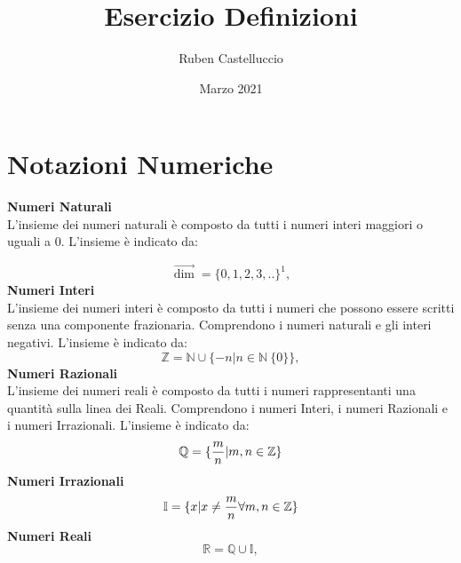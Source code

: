 \documentclass{article}
\title{Esercizio Definizioni}
\author{Ruben Castelluccio}
\date{Marzo 2021}
\begin{document}
\maketitle

\section{Notazioni Numeriche}
\textbf{Numeri Naturali}
\\
L’insieme dei numeri naturali è composto da tutti i numeri interi maggiori o uguali a 0. L’insieme è indicato da:

\begin{equation}
  \overrightarrow{\dim} = \{0,1,2,3,..\}^1,
\end{equation}
\textbf{Numeri Interi}
\\
L’insieme dei numeri interi è composto da tutti i numeri che possono essere scritti senza una componente frazionaria. Comprendono i numeri naturali e gli interi negativi. L’insieme è indicato da:
\begin{equation}
  \mathbb{Z} = \mathbb{N} \cup \{ -n | n \in \mathbb{N} \ \{0\}\},
\end{equation}
\textbf{Numeri Razionali}
\\
L’insieme dei numeri reali è composto da tutti i numeri rappresentanti una quantità sulla linea dei Reali. Comprendono i numeri Interi, i numeri Razionali e i numeri Irrazionali. L’insieme è indicato da:
\begin{equation}
\mathbb{Q} = \{ {m \over n} | m,n \in \mathbb{Z}\}
\end{equation}
\textbf{Numeri Irrazionali}
\begin{equation}
\mathbb{I} = \{ x | x \ne {m \over n}  \forall m,n \in \mathbb{Z}\}
\end{equation}
\textbf{Numeri Reali}
\begin{equation}
  \mathbb{R} = \mathbb{Q} \cup \mathbb{I},
\end{equation}
\end{document}
